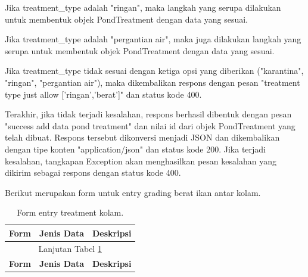 \begin{enumerate}[1.]
Jika treatment\_type adalah "ringan", maka langkah yang serupa dilakukan untuk membentuk objek PondTreatment dengan data yang sesuai.

Jika treatment\_type adalah "pergantian air", maka juga dilakukan langkah yang serupa untuk membentuk objek PondTreatment dengan data yang sesuai.

Jika treatment\_type tidak sesuai dengan ketiga opsi yang diberikan ("karantina", "ringan", "pergantian air"), maka dikembalikan respons dengan pesan "treatment type just allow ['ringan','berat']" dan status kode 400.

Terakhir, jika tidak terjadi kesalahan, respons berhasil dibentuk dengan pesan "success add data pond treatment" dan nilai id dari objek PondTreatment yang telah dibuat. Respons tersebut dikonversi menjadi JSON dan dikembalikan dengan tipe konten "application/json" dan status kode 200. Jika terjadi kesalahan, tangkapan Exception akan menghasilkan pesan kesalahan yang dikirim sebagai respons dengan status kode 400.

Berikut merupakan form untuk entry grading berat ikan antar kolam.

\begin{longtable}{| l | p{5cm} | p{5cm} |}
\caption{Form entry treatment kolam.\label{table:form_entry_treatment_kolam}}\\

\hline
\multicolumn{1}{|c|}{\textbf{Form}} & \multicolumn{1}{|c|}{\textbf{Jenis Data}} & \multicolumn{1}{|c|}{\textbf{Deskripsi}}\\
\hline
\endfirsthead

\hline
\multicolumn{3}{|c|}{Lanjutan Tabel \ref{table:form_entry_treatment_kolam}}\\
\hline
\multicolumn{1}{|c|}{\textbf{Form}} & \multicolumn{1}{|c|}{\textbf{Jenis Data}} & \multicolumn{1}{|c|}{\textbf{Deskripsi}}\\
\hline
\endhead

                                          


\end{longtable}
\end{enumerate}
